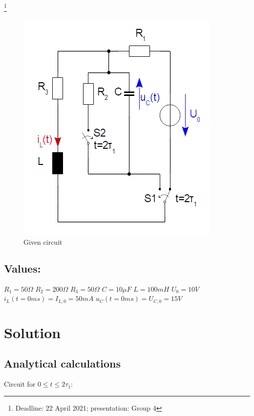 \documentclass[a4paper]{article}
\newcommand\blfootnote[1]{%
	\begingroup
	\renewcommand\thefootnote{}\footnote{#1}%
	\addtocounter{footnote}{-1}%
	\endgroup
}
\begin{document}
	\vspace*{8cm}
	
\blfootnote{Deadline: 22 April 2021; \qquad presentation: Group 4}

\newpage	
\vspace*{4cm}
\begin{figure}[h!] \centering
		\includegraphics{./Figures/homework04_circuit.png}
			\caption{Given circuit}
			\label{fig:circuit_hw04}
\end{figure}

\vspace*{2cm} \subsection*{Values:}
$R_1 = 50\Omega$ \qquad $R_2 = 200\Omega$ \qquad $R_3 = 50\Omega$ \qquad $C = 10\mu F$ \qquad $L = 100mH$ \qquad $U_0 = 10V$ \newline 
$i_L(t=0ms)=I_{L,0}=50mA$ \qquad $u_C(t=0ms) = U_{C,0} = 15V$

\newpage
\section{Solution}
\subsection{Analytical calculations}
Circuit for $0 \leq t \leq 2\tau_1$:
\end{document}
